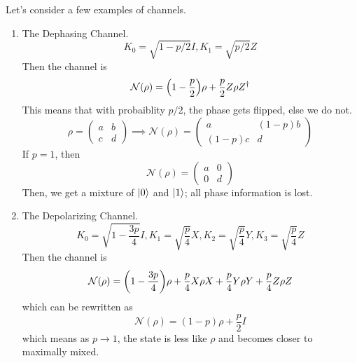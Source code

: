 Let's consider a few examples of channels.
\begin{example}
    \begin{enumerate}
        \item The Dephasing Channel.
        \[ K_0 = \sqrt{1 - p/2} I, K_1 = \sqrt{p/2} Z \]
        Then the channel is \[\mathcal{N}(\rho) = \qty(1 - \frac{p}{2}) \rho + \frac{p}{2} Z \rho Z^{\dagger}\]
        This means that with probaiblity $p/2$, the phase gets flipped, else we do not.
        \[ \rho = \begin{pmatrix}
            a & b \\ c & d
        \end{pmatrix} \implies \mathcal{N}(\rho) = \begin{pmatrix}
            a & (1 - p) b \\ (1 - p) c & d
        \end{pmatrix} \]
        If $p = 1$, then 
        \[ \mathcal{N}(\rho) = \begin{pmatrix}
            a & 0 \\ 0 & d
        \end{pmatrix} \]
        Then, we get a mixture of $\ket{0}$ and $\ket{1}$; all phase information is lost.
        \item The Depolarizing Channel.
        \[ K_0 = \sqrt{1 - \frac{3p}{4}} I, K_1 = \sqrt{\frac{p}{4}} X, K_2 = \sqrt{\frac{p}{4}} Y, K_3 = \sqrt{\frac{p}{4}} Z \]
        Then the channel is 
        \[ \mathcal{N}(\rho) = \qty(1 - \frac{3p}{4}) \rho + \frac{p}{4} X \rho X + \frac{p}{4} Y \rho Y + \frac{p}{4} Z \rho Z\]
        which can be rewritten as
        \[ \mathcal{N}(\rho) = (1 - p) \rho + \frac{p}{2} I  \]
        which means as $p \to 1$, the state is less like $\rho$ and becomes closer to maximally mixed.
    \end{enumerate}
\end{example}

